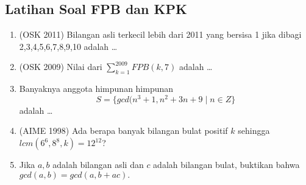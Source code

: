 \subsection{Latihan Soal FPB dan KPK}
\begin{enumerate}
    \item (OSK 2011) Bilangan asli terkecil lebih dari 2011 yang bersisa 1 jika dibagi 2,3,4,5,6,7,8,9,10 adalah \dots
    
    \item (OSK 2009) Nilai dari $\sum_{k=1}^{2009} FPB(k,7)$ adalah \dots
    
    \item Banyaknya anggota himpunan himpunan 
    $$S = \{gcd(n^3+1,n^2+3n+9 \mid n \in Z\}$$
    adalah \dots
    
    \item (AIME 1998) Ada berapa banyak bilangan bulat positif $k$ sehingga $lcm(6^6,8^8,k)=12^{12}$?
    
    \item Jika $a,b$ adalah bilangan asli dan $c$ adalah bilangan bulat, buktikan bahwa $gcd(a,b)=gcd(a,b+ac).$
\end{enumerate}